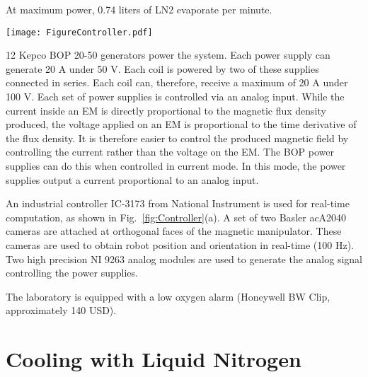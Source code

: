 At maximum power, 0.74 liters of LN2 evaporate per minute.
 \par
%
\begin{figure*}[ht]
\centering
	\texttt{[image: FigureController.pdf]}
	\caption{Block diagram of (a) the physical hardware and (b) the controller used for position control.
	\label{fig:Controller}	}
\end{figure*}
%
12 Kepco BOP 20-50 generators power the system. Each power supply can generate 20 A under 50 V. %
 Each coil is powered by two of these supplies connected in series. Each coil can, therefore, receive a maximum of 20 A under 100 V. %
 Each set of power supplies is controlled via an analog input. 
 While the current inside an EM is directly proportional to the magnetic flux density produced, the voltage applied on an EM is proportional to the time derivative of the flux density. 
 It is therefore easier to control the produced magnetic field by controlling the current rather than the voltage on the EM. 
 The BOP power supplies can do this when controlled in current mode. 
 In this mode, the power supplies output a current proportional to an analog input.

An industrial controller IC-3173 from National Instrument is used for real-time computation, as shown in Fig.~\ref{fig:Controller}(a).
 A set of two Basler acA2040 cameras are attached at orthogonal faces of the magnetic manipulator. 
  These cameras are used to obtain robot position and orientation in real-time (100 Hz). 
   Two high precision NI 9263 analog modules are used to generate the analog signal controlling the power supplies.
   
   The laboratory is equipped with a low oxygen alarm (Honeywell BW Clip, approximately 140 USD).

\section{Cooling with Liquid Nitrogen}\label{sec:CoolingWithLN2}
